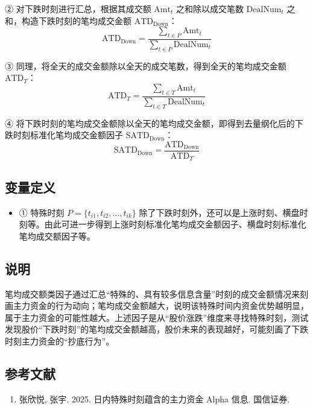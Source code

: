 \documentclass{article}
\begin{document}
② 对下跌时刻进行汇总，根据其成交额 \( \mathrm{Amt}_t \) 之和除以成交笔数 \( \mathrm{DealNum}_t \) 之和，构造下跌时刻的笔均成交金额 \( \mathrm{ATD}_{\mathrm{Down}} \)：
\begin{equation}
    \mathrm{ATD}_{\mathrm{Down}} = \frac{\sum_{t \in P} \mathrm{Amt}_t}{\sum_{t \in P} \mathrm{DealNum}_t}
\end{equation}

③ 同理，将全天的成交金额除以全天的成交笔数，得到全天的笔均成交金额 \( \mathrm{ATD}_T \)：
\begin{equation}
    \mathrm{ATD}_T = \frac{\sum_{t \in T} \mathrm{Amt}_t}{\sum_{t \in T} \mathrm{DealNum}_t}
\end{equation}

④ 将下跌时刻的笔均成交金额除以全天的笔均成交金额，即得到去量纲化后的下跌时刻标准化笔均成交金额因子 \( \mathrm{SATD}_{\mathrm{Down}} \)：
\begin{equation}
    \mathrm{SATD}_{\mathrm{Down}} = \frac{\mathrm{ATD}_{\mathrm{Down}}}{\mathrm{ATD}_T}
\end{equation}

\subsection{变量定义}
\begin{itemize}
    \item ① 特殊时刻 \( P = \{t_{i1}, t_{i2}, \dots, t_{ik}\} \) 除了下跌时刻外，还可以是上涨时刻、横盘时刻等。由此可进一步得到上涨时刻标准化笔均成交金额因子、横盘时刻标准化笔均成交额因子等。
\end{itemize}

\subsection{说明}
笔均成交额类因子通过汇总“特殊的、具有较多信息含量”时刻的成交金额情况来刻画主力资金的行为动向；笔均成交金额越大，说明该特殊时间内资金优势越明显，属于主力资金的可能性越大。上述因子是从“股价涨跌”维度来寻找特殊时刻，测试发现股价“下跌时刻”的笔均成交金额越高，股价未来的表现越好，可能刻画了下跌时刻主力资金的“抄底行为”。

\subsection{参考文献}
\begin{enumerate}
    \item 张欣悦, 张宇. 2025. 日内特殊时刻蕴含的主力资金 Alpha 信息. 国信证券.
\end{enumerate}
\end{document}
